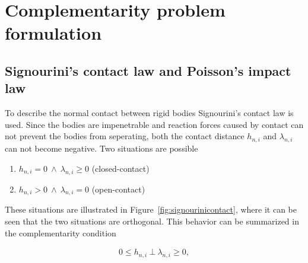 \documentclass[../DC2017114Bouma.tex]{subfiles}
\begin{document}
\section{Complementarity problem formulation}\label{sec:comp}
\subsection{Signourini's contact law and Poisson's impact law}
To describe the normal contact between rigid bodies Signourini's contact law is used. Since the bodies are impenetrable and reaction forces caused by contact can not prevent the bodies from seperating, both the contact distance $h_{n,i}$ and $\lambda_{n,i}$ can not become negative. Two situations are possible

\begin{enumerate}
\item $h_{n,i}=0\ \wedge\ \lambda_{n,i} \geq 0$ (closed-contact)
\item $h_{n,i}>0\ \wedge\ \lambda_{n,i} = 0$ (open-contact)
\end{enumerate}

These situations are illustrated in Figure~\ref{fig:signourinicontact}, where it can be seen that the two situations are orthogonal. This behavior can be summarized in the complementarity condition

\begin{align}
0\leq h_{n,i}\ \bot\ \lambda_{n,i} \geq 0,\label{eq:signourini}
\end{align}
\end{document}
